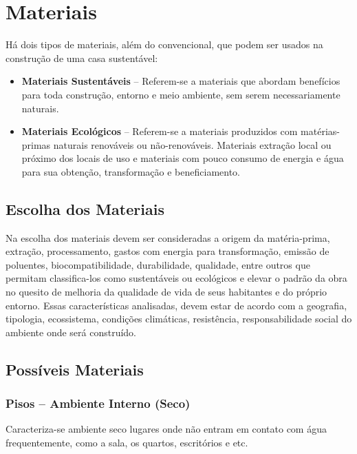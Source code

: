 \section{Materiais}

	Há dois tipos de materiais, além do convencional, que podem ser usados na construção de uma casa sustentável:

\begin{itemize}

	\item \textbf{Materiais Sustentáveis} – Referem-se a materiais que abordam benefícios para toda construção, entorno e meio ambiente, sem serem necessariamente naturais.

	\item \textbf{Materiais Ecológicos} – Referem-se a materiais produzidos com matérias-primas naturais renováveis ou não-renováveis. Materiais extração local ou próximo dos locais de uso e materiais com pouco consumo de energia e água para sua obtenção, transformação e beneficiamento.

\end{itemize}

\subsection{Escolha dos Materiais}

	Na escolha dos materiais devem ser consideradas a origem da matéria-prima, extração, processamento, gastos com energia para transformação, emissão de poluentes, biocompatibilidade, durabilidade, qualidade, entre outros que permitam classifica-los como sustentáveis ou ecológicos e elevar o padrão da obra no quesito de melhoria da qualidade de vida de seus habitantes e do próprio entorno. Essas características analisadas, devem estar de acordo com a geografia, tipologia, ecossistema, condições climáticas, resistência, responsabilidade social do ambiente onde será construído.

\subsection{Possíveis Materiais}

\subsubsection{Pisos – Ambiente Interno (Seco)}

	Caracteriza-se ambiente seco lugares onde não entram em contato com água frequentemente, como a sala, os quartos, escritórios e etc.\\

